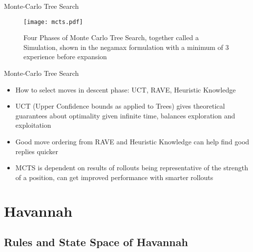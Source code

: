 \documentclass{beamer} %
\begin{document}
\begin{frame}{Monte-Carlo Tree Search}
\begin{figure}
	\centering
\texttt{[image: mcts.pdf]}
\caption{Four Phases of Monte Carlo Tree Search, together called a Simulation, shown in the negamax formulation with a minimum of 3 experience before expansion}
\end{figure}
\end{frame}

\begin{frame}{Monte-Carlo Tree Search}
\begin{itemize}
	\item How to select moves in descent phase: UCT, RAVE, Heuristic Knowledge
	\item UCT (Upper Confidence bounds as applied to Trees) gives theoretical guarantees about optimality given infinite time, balances exploration and exploitation
	\item Good move ordering from RAVE and Heuristic Knowledge can help find good replies quicker
	\item MCTS is dependent on results of rollouts being representative of the strength of a position, can get improved performance with smarter rollouts
\end{itemize}
\end{frame}





\section{Havannah}

\subsection{Rules and State Space of Havannah}
\end{document}
